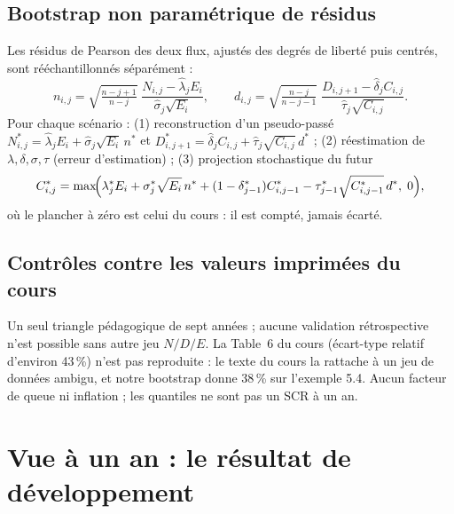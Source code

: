 \documentclass[11pt,a4paper]{article}
\begin{document}
\subsection*{Bootstrap non paramétrique de résidus}
Les résidus de Pearson des deux flux, ajustés des degrés de liberté puis centrés, sont rééchantillonnés séparément :
\[
n_{i,j}=\sqrt{\tfrac{n-j+1}{n-j}}\;\frac{N_{i,j}-\widehat\lambda_jE_i}{\widehat\sigma_j\sqrt{E_i}},\qquad
d_{i,j}=\sqrt{\tfrac{n-j}{n-j-1}}\;\frac{D_{i,j+1}-\widehat\delta_jC_{i,j}}{\widehat\tau_j\sqrt{C_{i,j}}}.
\]
Pour chaque scénario : (1) reconstruction d'un pseudo-passé $N^*_{i,j}=\widehat\lambda_jE_i+\widehat\sigma_j\sqrt{E_i}\,n^*$ et $D^*_{i,j+1}=\widehat\delta_jC_{i,j}+\widehat\tau_j\sqrt{C_{i,j}}\,d^*$ ; (2) réestimation de $\lambda,\delta,\sigma,\tau$ (erreur d'estimation) ; (3) projection stochastique du futur
\[
C^*_{i,j}=\max\!\Bigl(\lambda^*_jE_i+\sigma^*_j\sqrt{E_i}\,n^*+(1-\delta^*_{j-1})C^*_{i,j-1}-\tau^*_{j-1}\sqrt{C^*_{i,j-1}}\,d^*,\;0\Bigr),
\]
où le plancher à zéro est celui du cours : il est compté, jamais écarté.
\begin{table}[H]\centering\small
\tabSchnieperBootstrap
\caption{Bootstrap de l'exemple 5.4 (5\,000 scénarios, graine 42), en unités du cours. L'écart-type du bootstrap est cohérent avec la somme quadratique de l'erreur de paramètres et de la variance de processus.}
\end{table}

\newpage
\subsection*{Contrôles contre les valeurs imprimées du cours}
\begin{table}[H]\centering\small
\tabSchnieperControles
\caption{Reproduction des valeurs du cours, après arrondi identique. L'exemple 5.6 du cours (nombres au-dessus d'un seuil, 7,97 sinistres à venir) est reproduit par les tests.}
\end{table}
\begin{limitbox}
Un seul triangle pédagogique de sept années ; aucune validation rétrospective n'est possible sans autre jeu $N/D/E$. La Table~6 du cours (écart-type relatif d'environ 43\,\%) n'est pas reproduite : le texte du cours la rattache à un jeu de données ambigu, et notre bootstrap donne 38\,\% sur l'exemple 5.4. Aucun facteur de queue ni inflation ; les quantiles ne sont pas un SCR à un an.
\end{limitbox}

\newpage
\section{Vue à un an : le résultat de développement}\label{sec:mw}
\end{document}
